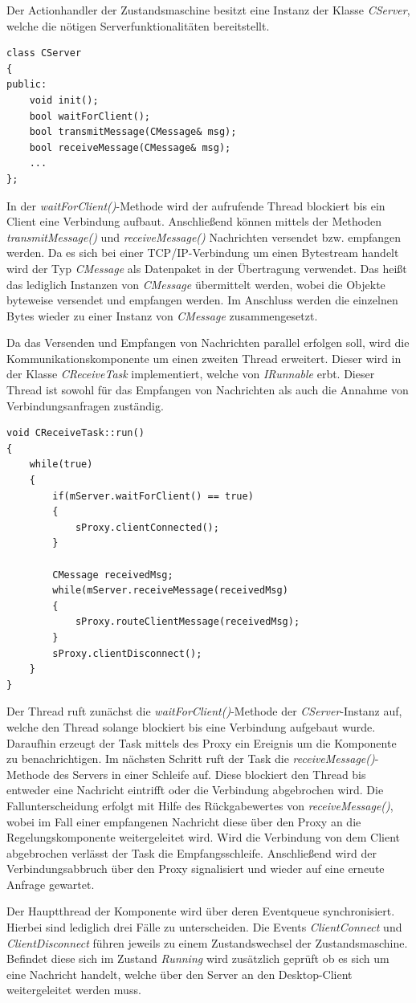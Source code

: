Der Actionhandler der Zustandsmaschine besitzt eine Instanz der Klasse \textit{CServer}, welche die nötigen Serverfunktionalitäten bereitstellt.
\begin{lstlisting}[caption={Implementierung der Server-Klasse},captionpos=b]
class CServer
{
public:
	void init();
	bool waitForClient();
	bool transmitMessage(CMessage& msg);
	bool receiveMessage(CMessage& msg);
	...
};
\end{lstlisting}
In der \textit{waitForClient()}-Methode wird der aufrufende Thread blockiert bis ein Client eine Verbindung aufbaut. Anschließend können mittels der Methoden \textit{transmitMessage()} und \textit{receiveMessage()} Nachrichten versendet bzw. empfangen werden. Da es sich bei einer TCP/IP-Verbindung um einen Bytestream handelt wird der Typ \textit{CMessage} als Datenpaket in der Übertragung verwendet. Das heißt das lediglich Instanzen von \textit{CMessage} übermittelt werden, wobei die Objekte byteweise versendet und empfangen werden. Im Anschluss werden die einzelnen Bytes wieder zu einer Instanz von \textit{CMessage} zusammengesetzt.

Da das Versenden und Empfangen von Nachrichten parallel erfolgen soll, wird die Kommunikationskomponente um einen zweiten Thread erweitert. Dieser wird in der Klasse \textit{CReceiveTask} implementiert, welche von \textit{IRunnable} erbt. Dieser Thread ist sowohl für das Empfangen von Nachrichten als auch die Annahme von Verbindungsanfragen zuständig.
\begin{lstlisting}[caption={Implementierung des Receive-Tasks},captionpos=b]
void CReceiveTask::run()
{
	while(true)
	{
		if(mServer.waitForClient() == true)
		{
			sProxy.clientConnected();
		}
		
		CMessage receivedMsg;
		while(mServer.receiveMessage(receivedMsg)
		{
			sProxy.routeClientMessage(receivedMsg);
		}
		sProxy.clientDisconnect();
	}
}
\end{lstlisting}
Der Thread ruft zunächst die \textit{waitForClient()}-Methode der \textit{CServer}-Instanz auf, welche den Thread solange blockiert bis eine Verbindung aufgebaut wurde. Daraufhin erzeugt der Task mittels des Proxy ein Ereignis um die Komponente zu benachrichtigen. Im nächsten Schritt ruft der Task die \textit{receiveMessage()}-Methode des Servers in einer Schleife auf. Diese blockiert den Thread bis entweder eine Nachricht eintrifft oder die Verbindung abgebrochen wird. Die Fallunterscheidung erfolgt mit Hilfe des Rückgabewertes von \textit{receiveMessage()}, wobei im Fall einer empfangenen Nachricht diese über den Proxy an die Regelungskomponente weitergeleitet wird. Wird die Verbindung von dem Client abgebrochen verlässt der Task die Empfangsschleife. Anschließend wird der Verbindungsabbruch über den Proxy signalisiert und wieder auf eine erneute Anfrage gewartet.

Der Hauptthread der Komponente wird über deren Eventqueue synchronisiert. Hierbei sind lediglich drei Fälle zu unterscheiden. Die Events \textit{ClientConnect} und \textit{ClientDisconnect} führen jeweils zu einem Zustandswechsel der Zustandsmaschine. Befindet diese sich im Zustand \textit{Running} wird zusätzlich geprüft ob es sich um eine Nachricht handelt, welche über den Server an den Desktop-Client weitergeleitet werden muss.
